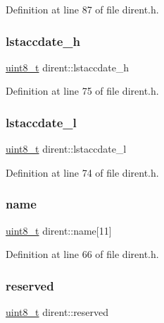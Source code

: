 Definition at line 87 of file dirent.\+h.

\mbox{\label{structdirent_a20feb935033ef90c0bc4b72b17ce9102}} 
\subsubsection{\texorpdfstring{lstaccdate\_h}{lstaccdate\_h}}
{\footnotesize\ttfamily \mbox{\hyperlink{stdint_8h_aba7bc1797add20fe3efdf37ced1182c5}{uint8\+\_\+t}} dirent\+::lstaccdate\+\_\+h}



Definition at line 75 of file dirent.\+h.

\mbox{\label{structdirent_abc055613885859998a5493153544f714}} 
\subsubsection{\texorpdfstring{lstaccdate\_l}{lstaccdate\_l}}
{\footnotesize\ttfamily \mbox{\hyperlink{stdint_8h_aba7bc1797add20fe3efdf37ced1182c5}{uint8\+\_\+t}} dirent\+::lstaccdate\+\_\+l}



Definition at line 74 of file dirent.\+h.

\mbox{\label{structdirent_a5f4ed9b26e0cbb4d1e85bf27b3e11d4d}} 
\subsubsection{\texorpdfstring{name}{name}}
{\footnotesize\ttfamily \mbox{\hyperlink{stdint_8h_aba7bc1797add20fe3efdf37ced1182c5}{uint8\+\_\+t}} dirent\+::name\mbox{[}11\mbox{]}}



Definition at line 66 of file dirent.\+h.

\mbox{\label{structdirent_a9219e6a97f3e1eef1e44c72d14ae72ee}} 
\subsubsection{\texorpdfstring{reserved}{reserved}}
{\footnotesize\ttfamily \mbox{\hyperlink{stdint_8h_aba7bc1797add20fe3efdf37ced1182c5}{uint8\+\_\+t}} dirent\+::reserved}



